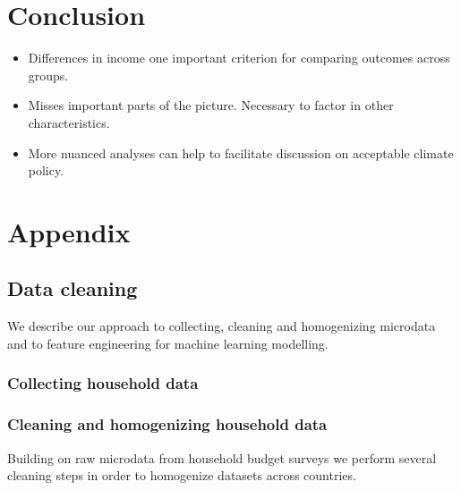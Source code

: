 \documentclass[12pt, a4paper]{article}
\begin{document}
\section{Conclusion} \label{sec:conclusion}

\begin{itemize}
 \item Differences in income one important criterion for comparing outcomes across groups.
 \item Misses important parts of the picture. Necessary to factor in other characteristics.
 \item More nuanced analyses can help to facilitate discussion on acceptable climate policy.
\end{itemize}

\clearpage

\printbibliography

\clearpage

\appendix

\section{Appendix} \label{sec:appendix}

\subsection{Data cleaning} \label{sec:cleaning}

We describe our approach to collecting, cleaning and homogenizing microdata and to feature engineering for machine learning modelling. 

\subsubsection{Collecting household data}



\subsubsection{Cleaning and homogenizing household data}

Building on raw microdata from household budget surveys we perform several cleaning steps in order to homogenize datasets across countries.
\end{document}
